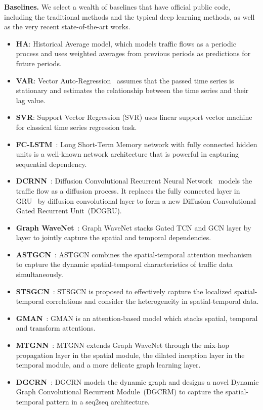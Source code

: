 \documentclass[sigconf, nonacm]{acmart}
\begin{document}
\noindent\textbf{Baselines.} We select a wealth of baselines that have official public code, including the traditional methods and the typical deep learning methods, as well as  the very recent state-of-the-art works.
\begin{itemize}
    \item \textbf{HA}: 
    Historical Average model, which models traffic flows as a periodic process and uses weighted averages from previous periods as predictions for future periods.
    \item \textbf{VAR}: 
    Vector Auto-Regression~\cite{VAR, lutkepohl2005new} assumes that the passed time series is stationary and estimates the relationship between the time series and their lag value.~\cite{2020STGNN}
    \item \textbf{SVR}: Support Vector Regression (SVR) uses linear support vector machine for classical time series regression task.
    \item \textbf{FC-LSTM}~\cite{FC-LSTM}: Long Short-Term Memory network with fully connected hidden units is a well-known network architecture that is powerful in capturing sequential dependency.
    \item \textbf{DCRNN}~\cite{2017DCRNN}: Diffusion Convolutional Recurrent Neural Network~\cite{2017DCRNN} models the traffic flow as a diffusion process. It replaces the fully connected layer in GRU~\cite{2014GRU} by diffusion convolutional layer to form a new Diffusion Convolutional Gated Recurrent Unit~(DCGRU).
    \item \textbf{Graph WaveNet}~\cite{GWNet}: Graph WaveNet stacks Gated TCN and GCN layer by layer to jointly capture the spatial and temporal dependencies.
    \item \textbf{ASTGCN}~\cite{2019ASTGCN}: ASTGCN combines the spatial-temporal attention mechanism to capture the dynamic spatial-temporal characteristics of traffic data simultaneously.
    \item \textbf{STSGCN}~\cite{2020STSGCN}: STSGCN is proposed to effectively capture the localized spatial-temporal correlations and consider the heterogeneity in spatial-temporal data.
    \item \textbf{GMAN}~\cite{2020GMAN}: GMAN is an attention-based model which stacks spatial, temporal and transform attentions.
    \item \textbf{MTGNN}~\cite{2020MTGNN}: MTGNN extends Graph WaveNet through the mix-hop propagation layer in the spatial module, the dilated inception layer in the temporal module, and a more delicate graph learning layer.
    \item \textbf{DGCRN}~\cite{2021DGCRN}: DGCRN models the dynamic graph and designs a novel Dynamic Graph Convolutional Recurrent Module~(DGCRM) to capture the spatial-temporal pattern in a seq2seq architecture. 
\end{itemize}
\end{document}
